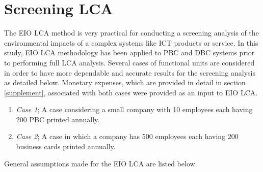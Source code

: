 \documentclass[conference]{IEEEtran}
\begin{document}
\section{Screening LCA} \label{ScreeningLCA}

The EIO LCA method is very practical for conducting a screening analysis of the environmental impacts of a complex systems like ICT products or service.  In this study, EIO LCA methodology has been applied to PBC and DBC systems prior to performing full LCA analysis. Several cases of functional units are considered in order to have more dependable and accurate results for the screening analysis as detailed below. Monetary expenses, which are provided in detail in section \ref{supplement},  associated with both cases were provided as an input to EIO LCA.

 \begin{enumerate}
 \item {\em Case 1}; A case considering a  small company with 10 employees each having 200 PBC printed annually.
 \item {\em Case 2}; A case in which a company has 500 employees each having 200 business cards printed annually.
 \end{enumerate}
 
 General assumptions made for the EIO LCA are listed below.
 
\end{document}
